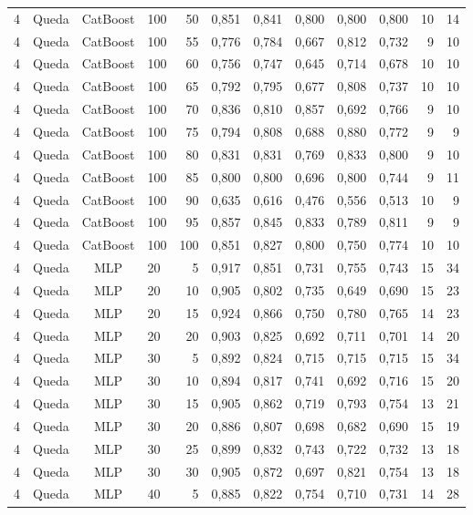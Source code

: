 \begin{longtable}{ccclrrrrrrrr}
4 & Queda & CatBoost & 100 & 50 & 0,851 & 0,841 & 0,800 & 0,800 & 0,800 & 10 & 14 \\
4 & Queda & CatBoost & 100 & 55 & 0,776 & 0,784 & 0,667 & 0,812 & 0,732 & 9 & 10 \\
4 & Queda & CatBoost & 100 & 60 & 0,756 & 0,747 & 0,645 & 0,714 & 0,678 & 10 & 10 \\
4 & Queda & CatBoost & 100 & 65 & 0,792 & 0,795 & 0,677 & 0,808 & 0,737 & 10 & 10 \\
4 & Queda & CatBoost & 100 & 70 & 0,836 & 0,810 & 0,857 & 0,692 & 0,766 & 9 & 10 \\
4 & Queda & CatBoost & 100 & 75 & 0,794 & 0,808 & 0,688 & 0,880 & 0,772 & 9 & 9 \\
4 & Queda & CatBoost & 100 & 80 & 0,831 & 0,831 & 0,769 & 0,833 & 0,800 & 9 & 10 \\
4 & Queda & CatBoost & 100 & 85 & 0,800 & 0,800 & 0,696 & 0,800 & 0,744 & 9 & 11 \\
4 & Queda & CatBoost & 100 & 90 & 0,635 & 0,616 & 0,476 & 0,556 & 0,513 & 10 & 9 \\
4 & Queda & CatBoost & 100 & 95 & 0,857 & 0,845 & 0,833 & 0,789 & 0,811 & 9 & 9 \\
4 & Queda & CatBoost & 100 & 100 & 0,851 & 0,827 & 0,800 & 0,750 & 0,774 & 10 & 10 \\
4 & Queda & MLP & 20 & 5 & 0,917 & 0,851 & 0,731 & 0,755 & 0,743 & 15 & 34 \\
4 & Queda & MLP & 20 & 10 & 0,905 & 0,802 & 0,735 & 0,649 & 0,690 & 15 & 23 \\
4 & Queda & MLP & 20 & 15 & 0,924 & 0,866 & 0,750 & 0,780 & 0,765 & 14 & 23 \\
4 & Queda & MLP & 20 & 20 & 0,903 & 0,825 & 0,692 & 0,711 & 0,701 & 14 & 20 \\
4 & Queda & MLP & 30 & 5 & 0,892 & 0,824 & 0,715 & 0,715 & 0,715 & 15 & 34 \\
4 & Queda & MLP & 30 & 10 & 0,894 & 0,817 & 0,741 & 0,692 & 0,716 & 15 & 20 \\
4 & Queda & MLP & 30 & 15 & 0,905 & 0,862 & 0,719 & 0,793 & 0,754 & 13 & 21 \\
4 & Queda & MLP & 30 & 20 & 0,886 & 0,807 & 0,698 & 0,682 & 0,690 & 15 & 19 \\
4 & Queda & MLP & 30 & 25 & 0,899 & 0,832 & 0,743 & 0,722 & 0,732 & 13 & 18 \\
4 & Queda & MLP & 30 & 30 & 0,905 & 0,872 & 0,697 & 0,821 & 0,754 & 13 & 18 \\
4 & Queda & MLP & 40 & 5 & 0,885 & 0,822 & 0,754 & 0,710 & 0,731 & 14 & 28 \\

\end{longtable}
